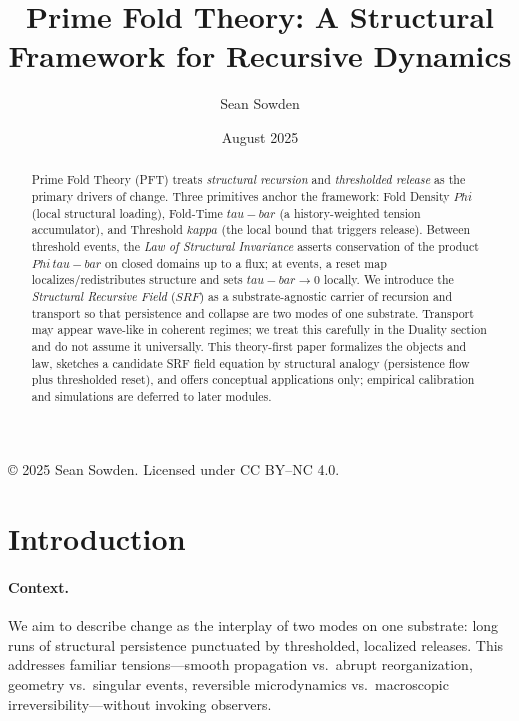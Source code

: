 \documentclass[12pt]{article}
\title{Prime Fold Theory: A Structural Framework for Recursive Dynamics}
\author{Sean Sowden}
\date{August 2025}
\newcommand{\FoldDensity}{\Phi}
\newcommand{\FoldTime}{\bar{\tau}}
\newcommand{\Threshold}{\kappa}
\newcommand{\SRF}{\mathcal{F}_{\mathrm{SR}}}
\def\FoldDensity{Phi}%
\def\FoldTime{tau-bar}%
\def\Threshold{kappa}%
\def\SRF{SRF}%
\def\bar#1{#1}%
\def\mathcal#1{#1}%
\def\mathrm#1{#1}%
\begin{document}
\maketitle
\begin{center}
  \begingroup\small
  \noindent © 2025 Sean Sowden. Licensed under CC BY--NC 4.0.
  \par\endgroup
\end{center}


\begin{abstract}
Prime Fold Theory (PFT) treats \emph{structural recursion} and \emph{thresholded release} as the primary drivers of change. Three primitives anchor the framework: Fold Density $\FoldDensity$ (local structural loading), Fold-Time $\FoldTime$ (a history-weighted tension accumulator), and Threshold $\Threshold$ (the local bound that triggers release). Between threshold events, the \emph{Law of Structural Invariance} asserts conservation of the product $\FoldDensity\,\FoldTime$ on closed domains up to a flux; at events, a reset map localizes/redistributes structure and sets $\FoldTime\!\to\!0$ locally. We introduce the \emph{Structural Recursive Field} ($\SRF$) as a substrate-agnostic carrier of recursion and transport so that persistence and collapse are two modes of one substrate. Transport may appear wave-like in coherent regimes; we treat this carefully in the Duality section and do not assume it universally. This theory-first paper formalizes the objects and law, sketches a candidate SRF field equation by structural analogy (persistence flow plus thresholded reset), and offers conceptual applications only; empirical calibration and simulations are deferred to later modules.
\end{abstract}

\tableofcontents

\section{Introduction}

\paragraph{Context.}
We aim to describe change as the interplay of two modes on one substrate: long runs of structural persistence punctuated by thresholded, localized releases. This addresses familiar tensions—smooth propagation vs.\ abrupt reorganization, geometry vs.\ singular events, reversible microdynamics vs.\ macroscopic irreversibility—without invoking observers.
\end{document}
